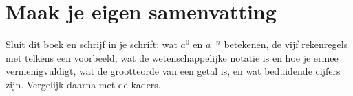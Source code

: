 
\begin{oefeningen}






\end{oefeningen}


\ifzelfstudie
\section*{Maak je eigen samenvatting}
Sluit dit boek en schrijf in je schrift: wat $a^0$ en $a^{-n}$ betekenen, de vijf rekenregels met telkens een voorbeeld, wat de wetenschappelijke notatie is en hoe je ermee vermenigvuldigt, wat de grootteorde van een getal is, en wat beduidende cijfers zijn. Vergelijk daarna met de kaders.
\fi
